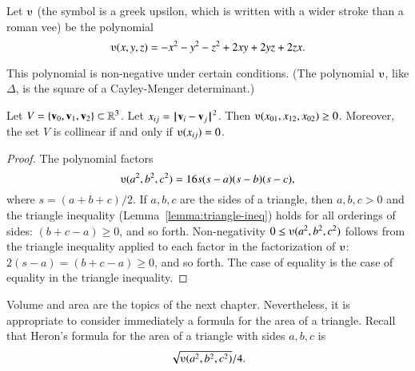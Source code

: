 \begin{definition}[$\ups$]\label{def:ups}
Let $\ups$ (the symbol is a greek upsilon, which is written with a
wider stroke than a roman vee) be the polynomial
\begin{displaymath}\ups(x,y,z) = -x^2 - y^2 - z^2 + 2 x y + 2 y z + 2
  z x.\end{displaymath}
%
\end{definition}



This polynomial is non-negative under certain conditions. (The polynomial
$\ups$, like $\Delta$, 
is the square of a Cayley-Menger determinant.)  


\begin{lemma}[]\label{lemma:ups} Let
  $V=\{{\mathbf v}_0,{\mathbf v}_1,{\mathbf v}_2\}\subset\mathbb{R}^3$.  Let $x_{ij} =
  \norm{\v_i}{\v_j}^2$.  Then $\ups(x_{01},x_{12},x_{02})\ge 0$.
  Moreover, the set $V$ is collinear if and only if $\ups(x_{ij}) =
  0$.
\end{lemma}

\begin{proof}
The polynomial factors
\begin{displaymath}
\ups(a^2,b^2,c^2) = 16 s (s-a) (s-b)
  (s-c),
\end{displaymath}
where $s = (a+b+c)/2$.  If $a,b,c$ are the sides of a triangle, then
$a,b,c>0$ and the triangle inequality (Lemma~\ref{lemma:triangle-ineq})
holds for all orderings of sides: $(b+c-a)\ge 0$, and so forth.
Non-negativity $0\le \ups(a^2,b^2,c^2)$ follows from the triangle
inequality applied to each factor in the factorization of $\ups$:
$2(s-a) = (b+c-a) \ge0$, and so forth.  The case of equality is the
case of equality in the triangle inequality.
%
%
\end{proof}


%
Volume and area are the topics of the next chapter.  Nevertheless, it
is appropriate to consider immediately a formula for the area of a
triangle.  Recall that Heron's formula for the area of a triangle with
sides $a,b,c$
is \begin{displaymath}\sqrt{\ups(a^2,b^2,c^2)}/4.\end{displaymath}

